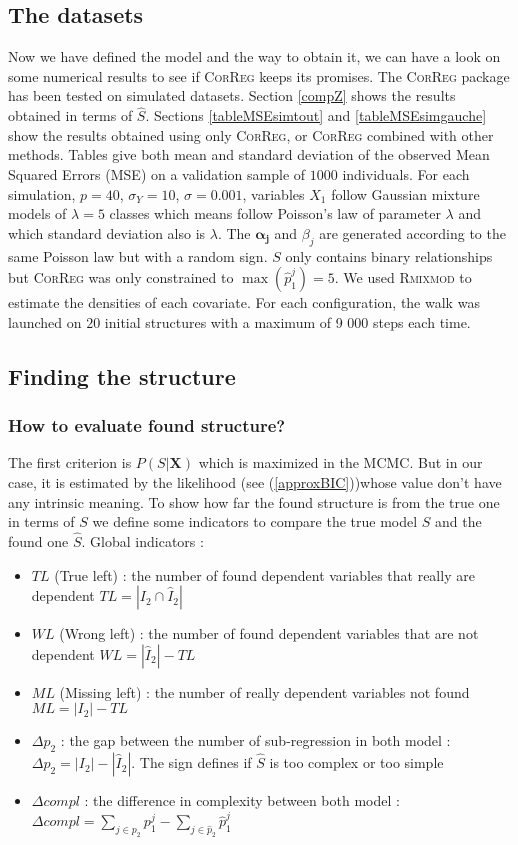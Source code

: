 \documentclass[11pt,a4paper]{article}
\begin{document}
	\subsection{The datasets}	
	Now we have defined the model and the way to obtain it, we can have a look on some numerical results to see if \textsc{CorReg} 	keeps its promises.
	The \textsc{CorReg} package has been tested on simulated datasets. 
Section \ref{compZ} shows the results obtained in terms of $\hat{S}$. Sections \ref{tableMSEsimtout} and \ref{tableMSEsimgauche} show the results obtained using only \textsc{CorReg}, or \textsc{CorReg} combined with other methods. Tables give both mean and standard deviation of the observed Mean Squared Errors (MSE) on a validation sample of $1 000$ individuals. For each simulation,  $p=40$, $\sigma_Y=10$, $\sigma=0.001$, variables $X_1$ follow Gaussian mixture models of $\lambda=5$ classes which means follow Poisson's law of parameter $\lambda$ and which standard deviation also is $\lambda$. The $\boldsymbol{\alpha_j}$ and $\beta_j$ are generated according to the same Poisson law but with a random sign. $S$ only contains binary relationships but \textsc{CorReg} was only constrained to $\max (\hat{p}_1^j)=5$.  
	We used \textsc{Rmixmod} to estimate the densities of each covariate. For each configuration, the walk was launched on $20$ initial structures with a maximum of 9 000 steps each time.
	
		\subsection{Finding the structure}
		\subsubsection{How to evaluate found structure?}
			The first criterion is $P(S|\boldsymbol{X})$ which is maximized in the MCMC. But in our case, it is estimated by the likelihood (see (\ref{approxBIC}))whose value don't have any intrinsic meaning. To show how far the found structure is from the true one in terms of $S$ we define some indicators to compare the true model $S$ and the found one $\hat{S}$.
			Global indicators :
			\begin{itemize}
				\item $TL$ (True left) : the number of found dependent variables that really are dependent $TL=|I_2\cap \hat{I}_2|$ 
				\item $WL$ (Wrong left) : the number of found dependent variables that are not dependent $WL=|\hat{I}_2|-TL$
				\item $ML$ (Missing left) : the number of really dependent variables not found $ML=|I_2|-TL$
				\item $\Delta p_2$ : the gap between the number of sub-regression in both model : $\Delta p_2=|I_2|-|\hat{I}_2|$. The sign defines if $\hat{S}$ is too complex or too simple
				\item $\Delta compl$ : the difference in complexity between both model : $\Delta compl=\sum_{j \in p_2}p_1^j-\sum_{j \in \hat{p}_2}\hat{p}_1^j$
			\end{itemize}
\end{document}
